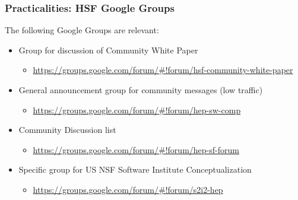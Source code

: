 \begin{frame}
\frametitle{Practicalities: HSF Google Groups}

The following Google Groups are relevant:

\begin{itemize} 

\item Group for discussion of Community White Paper
  \begin{itemize} 
  \item {\color{blue} \url{https://groups.google.com/forum/\#!forum/hsf-community-white-paper}}
  \end{itemize} 

\item General announcement group for community messages (low traffic)
  \begin{itemize} 
  \item {\color{blue} \url{https://groups.google.com/forum/\#!forum/hep-sw-comp}}
  \end{itemize} 

\item Community Discussion list
  \begin{itemize} 
  \item {\color{blue} \url{https://groups.google.com/forum/\#!forum/hep-sf-forum}}
  \end{itemize} 

\item Specific group for US NSF Software Institute Conceptualization
  \begin{itemize} 
  \item {\color{blue} \url{https://groups.google.com/forum/\#!forum/s2i2-hep}}
  \end{itemize} 

\end{itemize} 

\end{frame}


